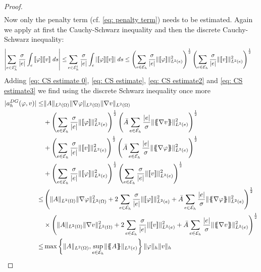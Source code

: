 \begin{proof}
\begin{align}
	\end{align}
	Now only the penalty term (cf. \eqref{eq: penalty term}) needs to be estimated. Again we apply at first the Cauchy-Schwarz inequality and then the discrete Cauchy-Schwarz inequality:
	\begin{align}
	\left| \sum_{e \in \mathcal{E}_h^i} \frac \sigma {|e|} \int_{e} {{\llbracket \varphi \rrbracket \llbracket v \rrbracket }\;ds} \right|
	\leq& \sum_{e \in \mathcal{E}_h^i} \frac \sigma  {|e|} \int_{e} {{ \left| \llbracket \varphi \rrbracket \llbracket v \rrbracket  \right|}\;ds}
	\leq \left( \sum\limits_{e \in \mathcal{E}_h} \frac \sigma{|e|} \lVert \llbracket \varphi \rrbracket \rVert_{L^2(e)}^2 \right)^{\frac 1 2} \left( \sum\limits_{e \in \mathcal{E}_h} \frac \sigma {|e|} \lVert \llbracket v \rrbracket \rVert_{L^2(e)}^2 \right)^{\frac 1 2} \label{eq: CS estimate3}
	\end{align}
	Adding \eqref{eq: CS estimate 0}, \eqref{eq: CS estimate}, \eqref{eq: CS estimate2} and \eqref{eq: CS estimate3} we find using the discrete Schwarz inequality once more
	\begin{align}
	|a_h^{DG}(\varphi,v)| \leq& 
	 \LTwonorm{A} \LTwonorm {\nabla \varphi} \LTwonorm{\nabla v} \nonumber\\
	& +\left( \sum\limits_{e \in \edges}\frac {\sigma}{|e|}\LTwonormE{\jump {\varphi}}^2 \right)^{\frac 1 2}
	\left( \bar A \sum\limits_{e \in \edges} \frac {|e|} \sigma \LTwonormE{\average{\nabla v}}^2 \right)^{\frac 1 2} \nonumber\\
	& +	\left( \sum\limits_{e \in \edges} \frac {\sigma} {|e|}\LTwonormE{\jump {v}}^2 \right)^{\frac 1 2}
	\left( \bar A \sum\limits_{e \in \edges} \frac {|e|} \sigma \LTwonormE{\average{\nabla \varphi}}^2 \right)^{\frac 1 2}\nonumber \\
	& + \left( \sum\limits_{e \in \edges} \frac \sigma{|e|} \LTwonormE{\jump{\varphi}}^2 \right)^{\frac 1 2} \left( \sum\limits_{e \in \edges} \frac \sigma {|e|} \LTwonormE{\jump{v}}^2 \right)^{\frac 1 2} \nonumber \\
	\leq& 
	\left( 
	\LTwonorm{A}\LTwonorm{\nabla \varphi}^2+2\sum\limits_{e \in \edges} \frac {\sigma} {|e|}\LTwonormE{\jump {\varphi}}^2+ \bar A\sum\limits_{e \in \edges} \frac {|e|} \sigma \LTwonormE{\average{\nabla \varphi}}^2
	\right)^{\frac 1 2} \nonumber \\
	&\times
	\left( 
	\LTwonorm{A} \LTwonorm{\nabla v}^2+2\sum\limits_{e \in \edges} \frac {\sigma}{|e|}\LTwonormE{\jump {v}}^2+ \bar A\sum\limits_{e \in \edges} \frac {|e|} \sigma \LTwonormE{\average{\nabla v}}^2
	\right) ^{\frac 1 2} \nonumber \\
	\leq & \max {\LTwonorm{A}} {\sup_{e \in \edges }\LTwonormE{\average A}} \eNorm \varphi \eNorm v   \label{eq: exact estimate boundedness} %
	\end{align}
\end{proof}

